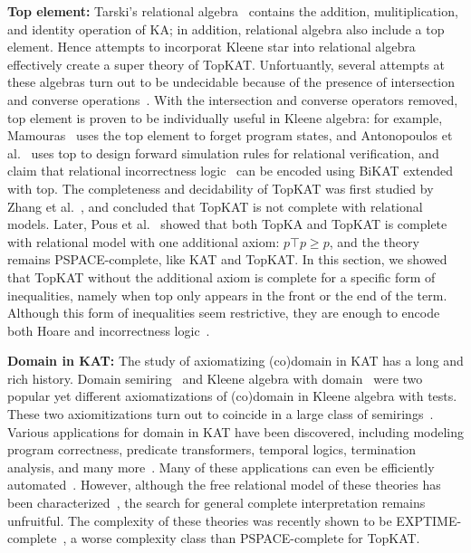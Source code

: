 \textbf{Top element:}
Tarski's relational algebra~\cite{tarski_CalculusRelations_1941} contains the addition, 
mulitiplication, and identity operation of KA;  
in addition, relational algebra also include a top element. 
Hence attempts to incorporat Kleene star into relational algebra 
effectively create a super theory of TopKAT.
Unfortuantly, several attempts at these algebras turn out to be undecidable
because of the presence of intersection and 
converse operations~\cite{andrekaAxiomatizabilityPositiveAlgebras2011, pous_PositiveCalculusRelations_2018}.
With the intersection and converse operators removed, 
top element is proven to be individually useful in Kleene algebra:
for example, Mamouras~\cite{Mamouras_2017} uses the top element to forget program states,
and Antonopoulos et al.~\cite{Antonopoulos_Koskinen_Le_Nagasamudram_Naumann_Ngo_2022} 
uses top to design forward simulation rules for relational verification, 
and claim that relational incorrectness logic~\cite{murray_UnderApproximateRelationalLogic_2020a} 
can be encoded using BiKAT extended with top.
The completeness and decidability of TopKAT was first studied by Zhang et al.~\cite{Zhang_de_Amorim_Gaboardi_2022},
and concluded that TopKAT is not complete with relational models.
Later, Pous et al.~\cite{Pous_Wagemaker_2022,Pous_Wagemaker_2023} showed that 
both TopKA and TopKAT is complete with relational model with one additional axiom: \(p ⊤ p ≥ p\),
and the theory remains PSPACE-complete, like KAT and TopKAT.
In this section, we showed that TopKAT without the additional axiom is complete 
for a specific form of inequalities, namely when top only appears in the front or the end of the term.
Although this form of inequalities seem restrictive, 
they are enough to encode both Hoare and incorrectness logic~\cite{Zhang_de_Amorim_Gaboardi_2022}.

\textbf{Domain in KAT:}
The study of axiomatizing (co)domain in KAT has a long and rich history. 
Domain semiring~\cite{Desharnais_Struth_2011} 
and Kleene algebra with domain~\cite{Desharnais_Möller_Struth_2006}
were two popular yet different axiomatizations of (co)domain in Kleene algebra with tests.
These two axiomitizations turn out to coincide in a large class of semirings~\cite{Fahrenberg_Johansen_Struth_Ziemiánski_2021}.
Various applications for domain in KAT have been discovered, including modeling
program correctness, predicate transformers, temporal logics, 
termination analysis, and many more~\cite{Desharnais_Möller_Struth_2004}.
Many of these applications can even be efficiently automated~\cite{hofner_AutomatedReasoningKleene_2007}.
However, although the free relational model of these theories has been characterized~\cite{mclean_FreeKleeneAlgebras_2020},
the search for general complete interpretation remains unfruitful.
The complexity of these theories was recently shown to be EXPTIME-complete~\cite{Sedlár_2023},
a worse complexity class than PSPACE-complete for TopKAT.
